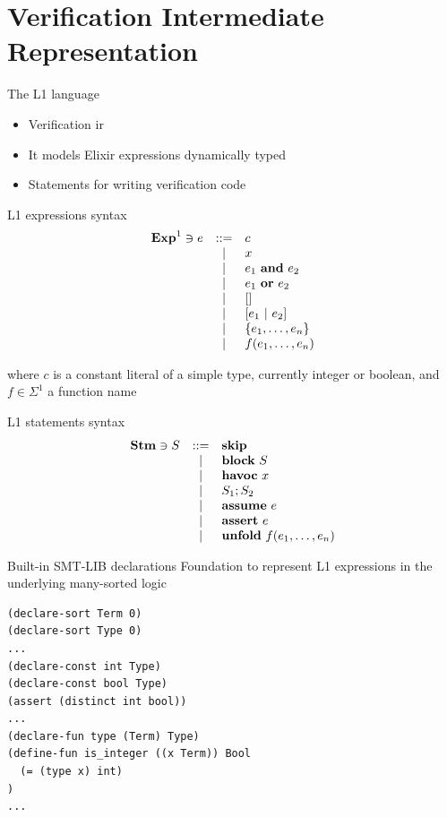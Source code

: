 \documentclass{beamer}
\begin{document}
  \section{Verification Intermediate Representation}
  \begin{frame}{The L1 language}
    \begin{itemize}
      \item \pause Verification \gls*{ir} 
      \item \pause It models Elixir expressions dynamically typed
      \item \pause Statements for writing verification code
    \end{itemize}
  \end{frame}
  \begin{frame}{L1 expressions syntax}
    \[
      \begin{array}{rcll}
        \mathbf{Exp}^{1} \ni e & ::= & c \\
        & | & x \\
        & | & e_1~\textbf{and}~e_2 \\
        & | & e_1~\textbf{or}~e_2 \\
        & | & [] \\
        & | & [e_1~|~e_2] \\
        & | & \{e_1, \ldots, e_n\} \\
        & | & f(e_1, \ldots, e_n) \\
      \end{array}
    \]

    \pause where $c$ is a constant literal of a simple type, currently integer or 
    boolean, and $f \in \Sigma^1$ a function name
  \end{frame}
  \begin{frame}{L1 statements syntax}
    \[
      \begin{array}{rcll}
        \mathbf{Stm} \ni S & ::= & \textbf{skip} \\
        & | & \textbf{block}~S \\
        & | & \textbf{havoc}~x \\
        & | & S_1;S_2 \\
        & | & \textbf{assume}~e \\
        & | & \textbf{assert}~e \\
        & | & \textbf{unfold}~f(e_1, \dots, e_n) \\
      \end{array}
    \]
  \end{frame}
  \begin{frame}[fragile]{Built-in SMT-LIB declarations}
    Foundation to represent L1 expressions in the underlying many-sorted logic

    \pause

    \small
    \begin{verbatim}
(declare-sort Term 0)
(declare-sort Type 0)
...
(declare-const int Type)
(declare-const bool Type)
(assert (distinct int bool))
...
(declare-fun type (Term) Type)
(define-fun is_integer ((x Term)) Bool 
  (= (type x) int)
)
...
    \end{verbatim}
  \end{frame}
\end{document}
